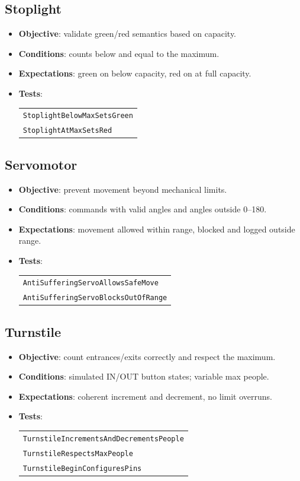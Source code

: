 \subsection{Stoplight}
\begin{itemize}
  \item \textbf{Objective}: validate green/red semantics based on capacity.
  \item \textbf{Conditions}: counts below and equal to the maximum.
  \item \textbf{Expectations}: green on below capacity, red on at full capacity.
  \item \textbf{Tests}:
  \begin{tabular}[t]{@{}l@{}}
    \texttt{StoplightBelowMaxSetsGreen}\\
    \texttt{StoplightAtMaxSetsRed}
  \end{tabular}
\end{itemize}

\subsection{Servomotor}
\begin{itemize}
  \item \textbf{Objective}: prevent movement beyond mechanical limits.
  \item \textbf{Conditions}: commands with valid angles and angles outside 0--180.
  \item \textbf{Expectations}: movement allowed within range, blocked and logged outside range.
  \item \textbf{Tests}:
  \begin{tabular}[t]{@{}l@{}}
    \texttt{AntiSufferingServoAllowsSafeMove}\\
    \texttt{AntiSufferingServoBlocksOutOfRange}
  \end{tabular}
\end{itemize}

\subsection{Turnstile}
\begin{itemize}
  \item \textbf{Objective}: count entrances/exits correctly and respect the maximum.
  \item \textbf{Conditions}: simulated IN/OUT button states; variable max people.
  \item \textbf{Expectations}: coherent increment and decrement, no limit overruns.
  \item \textbf{Tests}:
  \begin{tabular}[t]{@{}l@{}}
    \texttt{TurnstileIncrementsAndDecrementsPeople}\\
    \texttt{TurnstileRespectsMaxPeople}\\
    \texttt{TurnstileBeginConfiguresPins}
  \end{tabular}
\end{itemize}

